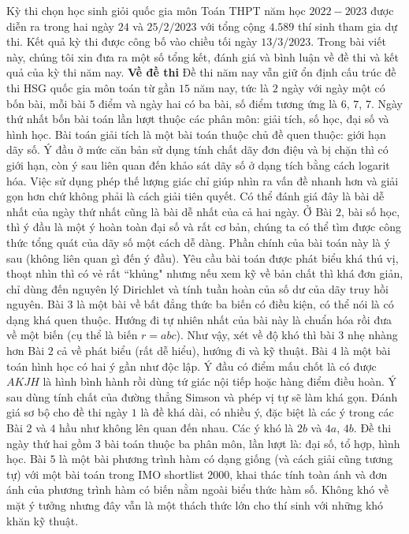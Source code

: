 \begin{multicols}{2}
	Kỳ thi chọn học sinh giỏi quốc gia môn Toán THPT năm học $2022-2023$ được diễn ra trong hai ngày $24$ và $25/2/2023$ với tổng cộng $4{.}589$ thí sinh tham gia dự thi. Kết quả kỳ thi được công bố vào chiều tối ngày $13/3/2023$. Trong bài viết này, chúng tôi xin đưa ra một số tổng kết, đánh giá và bình luận về đề thi và kết quả của kỳ thi năm nay.
	\vskip 0.05cm
	\textbf{\color{cackithi}Về đề thi}
	\vskip 0.05cm
	Đề thi năm nay vẫn giữ ổn định cấu trúc đề thi HSG quốc gia môn toán từ gần $15$ năm nay, tức là $2$ ngày với ngày một có bốn bài, mỗi bài $5$ điểm và ngày hai có ba bài, số điểm tương ứng là $6$, $7$, $7$.
	\vskip 0.05cm 
	Ngày thứ nhất bốn bài toán lần lượt thuộc các phân môn: giải tích, số học, đại số và hình học. Bài toán giải tích là một bài toán thuộc chủ đề quen thuộc: giới hạn dãy số. Ý đầu ở mức căn bản sử dụng tính chất dãy đơn điệu và bị chặn thì có giới hạn, còn ý sau liên quan đến khảo sát dãy số ở dạng tích bằng cách logarit hóa. Việc sử dụng phép thế lượng giác chỉ giúp nhìn ra vấn đề nhanh hơn và giải gọn hơn chứ không phải là cách giải tiên quyết. Có thể đánh giá đây là bài dễ nhất của ngày thứ nhất cũng là bài dễ nhất của cả hai ngày. 
	\vskip 0.05cm
	Ở Bài $2$, bài số học, thì ý đầu là một ý hoàn toàn đại số và rất cơ bản, chúng ta có thể tìm được công thức tổng quát của dãy số một cách dễ dàng. Phần chính của bài toán này là ý sau (không liên quan gì đến ý đầu). Yêu cầu bài toán được phát biểu khá thú vị, thoạt nhìn thì có vẻ rất ``khủng" nhưng nếu xem kỹ về bản chất thì khá đơn giản, chỉ dùng đến nguyên lý Dirichlet và tính tuần hoàn của số dư của dãy truy hồi nguyên. 
	\vskip 0.05cm
	Bài $3$ là một bài về bất đẳng thức ba biến có điều kiện, có thể nói là có dạng khá quen thuộc. Hướng đi tự nhiên nhất của bài này là chuẩn hóa rồi đưa về một biến (cụ thể là biến $r = abc$). Như vậy, xét về độ khó thì bài $3$ nhẹ nhàng hơn Bài $2$ cả về phát biểu (rất dễ hiểu), hướng đi và kỹ thuật.  
	\vskip 0.05cm
	Bài $4$ là một bài toán hình học có hai ý gần như độc lập. Ý đầu có điểm mấu chốt là có được $AKJH$ là hình bình hành rồi dùng tứ giác nội tiếp hoặc hàng điểm điều hoàn. Ý sau dùng tính chất của đường thẳng Simson và phép vị tự sẽ làm khá gọn. 
	\vskip 0.05cm
	Đánh giá sơ bộ cho đề thi ngày $1$ là đề khá dài, có nhiều ý, đặc biệt là các ý trong các Bài $2$ và $4$ hầu như không lên quan đến nhau. Các ý khó là $2b$ và $4a$, $4b$.
	\vskip 0.05cm 
	Đề thi ngày thứ hai gồm $3$ bài toán thuộc ba phân môn, lần lượt là: đại số, tổ hợp, hình học.
	\vskip 0.05cm
	Bài $5$ là một bài phương trình hàm có dạng giống (và cách giải cũng tương tự) với một bài toán trong IMO shortlist $2000$, khai thác tính toàn ánh và đơn ánh của phương trình hàm có biến nằm ngoài biểu thức hàm số. Không khó về mặt ý tưởng nhưng đây vẫn là một thách thức lớn cho thí sinh với những khó khăn kỹ thuật.   

\end{multicols}
